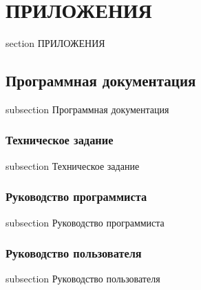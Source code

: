 \newpage
\section*{ПРИЛОЖЕНИЯ}
 {section} {ПРИЛОЖЕНИЯ}

\subsection*{Программная документация}
 {subsection} {Программная документация}

\subsubsection*{Техническое задание}
 {subsection} {Техническое задание}




\subsubsection*{Руководство программиста}
 {subsection} {Руководство программиста}



\subsubsection*{Руководство пользователя}
 {subsection} {Руководство пользователя}


